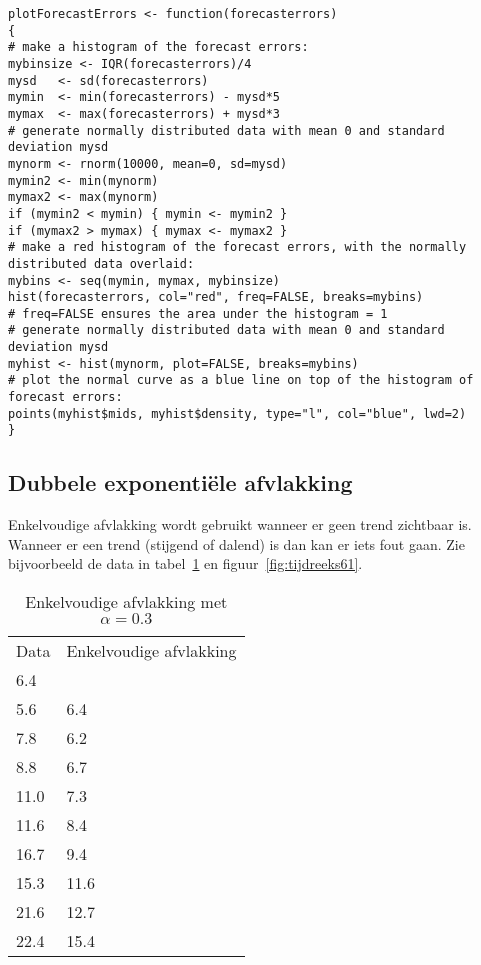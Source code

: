 \begin{lstlisting}
plotForecastErrors <- function(forecasterrors)
{
# make a histogram of the forecast errors:
mybinsize <- IQR(forecasterrors)/4
mysd   <- sd(forecasterrors)
mymin  <- min(forecasterrors) - mysd*5
mymax  <- max(forecasterrors) + mysd*3
# generate normally distributed data with mean 0 and standard deviation mysd
mynorm <- rnorm(10000, mean=0, sd=mysd)
mymin2 <- min(mynorm)
mymax2 <- max(mynorm)
if (mymin2 < mymin) { mymin <- mymin2 }
if (mymax2 > mymax) { mymax <- mymax2 }
# make a red histogram of the forecast errors, with the normally distributed data overlaid:
mybins <- seq(mymin, mymax, mybinsize)
hist(forecasterrors, col="red", freq=FALSE, breaks=mybins)
# freq=FALSE ensures the area under the histogram = 1
# generate normally distributed data with mean 0 and standard deviation mysd
myhist <- hist(mynorm, plot=FALSE, breaks=mybins)
# plot the normal curve as a blue line on top of the histogram of forecast errors:
points(myhist$mids, myhist$density, type="l", col="blue", lwd=2)
}
\end{lstlisting}

\subsection{Dubbele exponentiële afvlakking}

Enkelvoudige afvlakking wordt gebruikt wanneer er geen trend zichtbaar is. Wanneer er een trend (stijgend of dalend) is dan kan er iets fout gaan. Zie bijvoorbeeld de data in tabel~\ref{tab:trend} en figuur~\ref{fig:tijdreeks61}.

\begin{table}
\centering
    \begin{tabular}{|ll|}
    \hline
    Data & Enkelvoudige afvlakking \\
    6.4  & ~                      \\
    5.6  & 6.4                    \\
    7.8  & 6.2                    \\
    8.8  & 6.7                    \\
    11.0 & 7.3                    \\
    11.6 & 8.4                    \\
    16.7 & 9.4                    \\
    15.3 & 11.6                   \\
    21.6 & 12.7                   \\
    22.4 & 15.4                   \\ \hline
    \end{tabular}
		\caption{Enkelvoudige afvlakking met $\alpha = 0.3$}
		\label{tab:trend}
\end{table}

